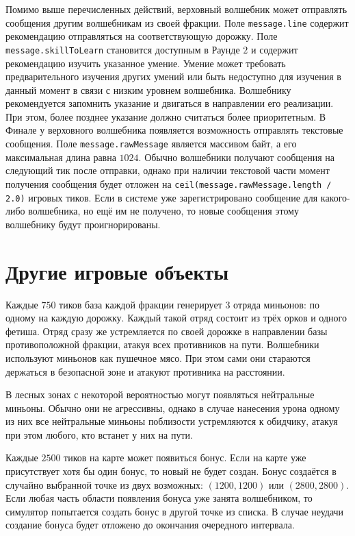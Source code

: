 
Помимо выше перечисленных действий, верховный волшебник может отправлять сообщения другим волшебникам из своей фракции. Поле
\texttt{message.line} содержит рекомендацию отправляться на соответствующую дорожку. Поле \texttt{message.skillToLearn} становится доступным
в Раунде $2$ и содержит рекомендацию изучить указанное умение. Умение может требовать предварительного изучения других умений или быть
недоступно для изучения в данный момент в связи с низким уровнем волшебника. Волшебнику рекомендуется запомнить указание и двигаться в
направлении его реализации. При этом, более позднее указание должно считаться более приоритетным. В Финале у верховного волшебника
появляется возможность отправлять текстовые сообщения. Поле \texttt{message.rawMessage} является массивом байт, а его максимальная длина
равна $1024$. Обычно волшебники получают сообщения на следующий тик после отправки, однако при наличии текстовой части момент получения
сообщения будет отложен на \texttt{ceil(message.rawMessage.length / 2.0)} игровых тиков. Если в системе уже зарегистрировано сообщение для
какого-либо волшебника, но ещё им не получено, то новые сообщения этому волшебнику будут проигнорированы.

\section{Другие игровые объекты}

Каждые $750$ тиков база каждой фракции генерирует $3$ отряда миньонов: по одному на каждую дорожку. Каждый такой отряд состоит из трёх орков
и одного фетиша. Отряд сразу же устремляется по своей дорожке в направлении базы противоположной фракции, атакуя всех противников на пути.
Волшебники используют миньонов как пушечное мясо. При этом сами они стараются держаться в безопасной зоне и атакуют противника на
расстоянии.

В лесных зонах с некоторой вероятностью могут появляться нейтральные миньоны. Обычно они не агрессивны, однако в случае нанесения урона
одному из них все нейтральные миньоны поблизости устремляются к обидчику, атакуя при этом любого, кто встанет у них на пути.

Каждые $2500$ тиков на карте может появиться бонус. Если на карте уже присутствует хотя бы один бонус, то новый не будет создан. Бонус
создаётся в случайно выбранной точке из двух возможных: $(1200, 1200)$ или $(2800, 2800)$. Если любая часть области появления бонуса уже
занята волшебником, то симулятор попытается создать бонус в другой точке из списка. В случае неудачи создание бонуса будет отложено до
окончания очередного интервала.

